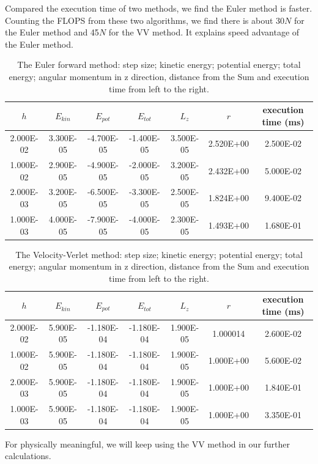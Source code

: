  Compared the execution time of two methods, we find the Euler method is faster. 
 Counting the FLOPS from these two algorithms, we find there is  about 30$N$ for the Euler method and 45$N$ for the VV method. It explains speed advantage of the Euler method.
 
\begin{table}[tb]
	\centering
	\caption{The Euler forward method: step size; kinetic energy; potential energy; total energy; angular momentum in z direction, distance from the Sum and execution time from left to the right.}
	\label{tab::euler}
	\begin{tabular}{ccccccc}
	\hline
	\hline
$h$          & $E_{kin}$        & $E_{pot}$         & $E_{tot}$          & $L_z$        & $r$         & execution time (ms)         \\
	\hline
2.000E-02 & 3.300E-05 & -4.700E-05 & -1.400E-05 & 3.500E-05 & 2.520E+00 & 2.500E-02 \\
1.000E-02 & 2.900E-05 & -4.900E-05 & -2.000E-05 & 3.200E-05 & 2.432E+00 & 5.000E-02 \\
2.000E-03 & 3.200E-05 & -6.500E-05 & -3.300E-05 & 2.500E-05 & 1.824E+00 & 9.400E-02 \\
1.000E-03 & 4.000E-05 & -7.900E-05 & -4.000E-05 & 2.300E-05 & 1.493E+00 & 1.680E-01\\
	\hline
	\hline
\end{tabular}
\end{table}

\begin{table}[tb]
	\centering
	\caption{The Velocity-Verlet method: step size; kinetic energy; potential energy; total energy; angular momentum in z direction, distance from the Sum and execution time from left to the right.}
	\label{tab::verlet}
	\begin{tabular}{ccccccc}
	\hline
	\hline
$h$          & $E_{kin}$        & $E_{pot}$         & $E_{tot}$          & $L_z$        & $r$         & execution time (ms)         \\
	\hline
2.000E-02 & 5.900E-05 & -1.180E-04 & -1.180E-04 & 1.900E-05 & 1.000014 & 2.600E-02 \\
1.000E-02 & 5.900E-05 & -1.180E-04 & -1.180E-04 & 1.900E-05 & 1.000E+00 & 5.600E-02 \\
2.000E-03 & 5.900E-05 & -1.180E-04 & -1.180E-04 & 1.900E-05 & 1.000E+00 & 1.840E-01 \\
1.000E-03 & 5.900E-05 & -1.180E-04 & -1.180E-04 & 1.900E-05 & 1.000E+00 & 3.350E-01\\
	\hline
	\hline
\end{tabular}
\end{table}

For physically meaningful, we will keep using the VV method in our further calculations.
